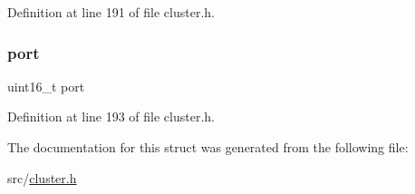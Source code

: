 Definition at line 191 of file cluster.\+h.

\mbox{\label{structcluster_msg_data_gossip_a8e0798404bf2cf5dabb84c5ba9a4f236}} 
\subsubsection{\texorpdfstring{port}{port}}
{\footnotesize\ttfamily uint16\+\_\+t port}



Definition at line 193 of file cluster.\+h.



The documentation for this struct was generated from the following file\+:\begin{DoxyCompactItemize}
\item 
src/\hyperlink{cluster_8h}{cluster.\+h}\end{DoxyCompactItemize}
